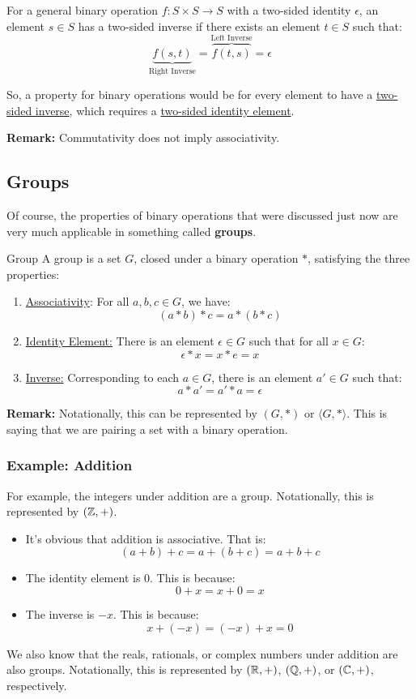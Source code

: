 \documentclass[letterpaper]{article}
\begin{document}
\begin{itemize}
    \bigskip 
    
    For a general binary operation $f: S \times S \to S$ with a two-sided identity $\epsilon$, an element $s \in S$ has a two-sided inverse if there exists an element $t \in S$ such that:
    \[\underbrace{f(s, t)}_{\text{Right Inverse}} = \overbrace{f(t, s)}^{\text{Left Inverse}} = \epsilon\] 

    So, a property for binary operations would be for every element to have a \underline{two-sided inverse}, which requires a \underline{two-sided identity element}.
\end{itemize}

\textbf{Remark:} Commutativity does not imply associativity.

\subsection{Groups}
Of course, the properties of binary operations that were discussed just now are very much applicable in something called \textbf{groups}. 

\begin{definition}{Group}{}
    A group is a set $G$, closed under a binary operation $*$, satisfying the three properties:
    \begin{enumerate}
        \item \underline{Associativity}: For all $a, b, c \in G$, we have:
        \[(a * b) * c = a * (b * c)\]

        \item \underline{Identity Element:} There is an element $\epsilon \in G$ such that for all $x \in G$:
        \[\epsilon * x = x * e = x\]

        \item \underline{Inverse:} Corresponding to each $a \in G$, there is an element $a' \in G$ such that:
        \[a * a' = a' * a = \epsilon\]
    \end{enumerate}
\end{definition}
\textbf{Remark:} Notationally, this can be represented by $(G, *)$ or $\langle G, * \rangle$. This is saying that we are pairing a set with a binary operation. 

\subsubsection{Example: Addition}
For example, the integers under addition are a group. Notationally, this is represented by $(\mathbb{Z}, +)$. 
\begin{itemize}
    \item It's obvious that addition is associative. That is:
    \[(a + b) + c = a + (b + c) = a + b + c\]

    \item The identity element is 0. This is because:
    \[0 + x = x + 0 = x\]

    \item The inverse is $-x$. This is because:
    \[x + (-x) = (-x) + x = 0\]
\end{itemize}
We also know that the reals, rationals, or complex numbers under addition are also groups. Notationally, this is represented by $(\mathbb{R}, +)$, $(\mathbb{Q}, +)$, or $(\mathbb{C}, +)$, respectively. 
\end{document}
